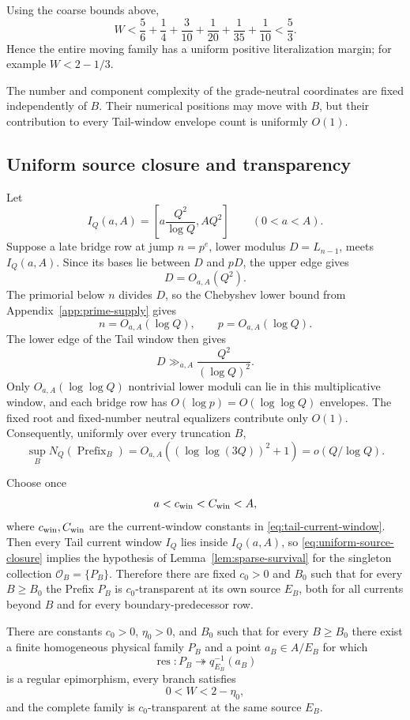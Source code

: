 Using the coarse bounds above,
\[
W
<
\frac56+\frac14+\frac3{10}+\frac1{20}+\frac1{35}+\frac1{10}
<\frac53.
\tag{SC12}\label{eq:source-closed-slack}
\]
Hence the entire moving family has a uniform positive literalization margin;
for example $W<2-1/3$.

The number and component complexity of the grade-neutral coordinates are
fixed independently of $B$.  Their numerical positions may move with $B$, but
their contribution to every Tail-window envelope count is uniformly $O(1)$.

\subsection{Uniform source closure and transparency}

Let
\[
I_Q(a,A)=
\left[a\frac{Q^2}{\log Q},AQ^2\right]
\qquad(0<a<A).
\]
Suppose a late bridge row at jump $n=p^e$, lower modulus $D=L_{n-1}$, meets
$I_Q(a,A)$.  Since its bases lie between $D$ and $pD$, the upper edge gives
\[
D=O_{a,A}(Q^2).
\]
The primorial below $n$ divides $D$, so the Chebyshev lower bound from
Appendix~\ref{app:prime-supply} gives
\[
n=O_{a,A}(\log Q),
\qquad p=O_{a,A}(\log Q).
\]
The lower edge of the Tail window then gives
\[
D\gg_{a,A}\frac{Q^2}{(\log Q)^2}.
\]
Only $O_{a,A}(\log\log Q)$ nontrivial lower moduli can lie in this
multiplicative window, and each bridge row has $O(\log p)=O(\log\log Q)$
envelopes.  The fixed root and fixed-number neutral equalizers contribute only
$O(1)$.  Consequently, uniformly over every truncation $B$,
\[
\sup_B N_Q(\operatorname{Prefix}_B)
=O_{a,A}((\log\log(3Q))^2+1)
=o(Q/\log Q).
\tag{SC13}\label{eq:uniform-source-closure}
\]

Choose once
\[
a<c_{\rm win}<C_{\rm win}<A,
\]
where $c_{\rm win},C_{\rm win}$ are the current-window constants in
\eqref{eq:tail-current-window}.  Then every Tail current window $I_Q$ lies
inside $I_Q(a,A)$, so \eqref{eq:uniform-source-closure} implies the hypothesis
of Lemma~\ref{lem:sparse-survival} for the singleton collection
$\mathcal O_B=\{P_B\}$.  Therefore there are fixed $c_0>0$ and $B_0$ such
that for every $B\ge B_0$ the Prefix $P_B$ is $c_0$-transparent at its own
source $E_B$, both for all currents beyond $B$ and for every boundary-predecessor
row.

\begin{proposition}\label{prop:source-closed-prefix}
There are constants $c_0>0$, $\eta_0>0$, and $B_0$ such that for every
$B\ge B_0$ there exist a finite homogeneous physical family $P_B$ and a point
$a_B\in A/E_B$ for which
\[
\operatorname{res}:P_B\twoheadrightarrow q_{E_B}^{-1}(a_B)
\]
is a regular epimorphism, every branch satisfies
\[
0<W<2-\eta_0,
\]
and the complete family is $c_0$-transparent at the same source $E_B$.
\end{proposition}

